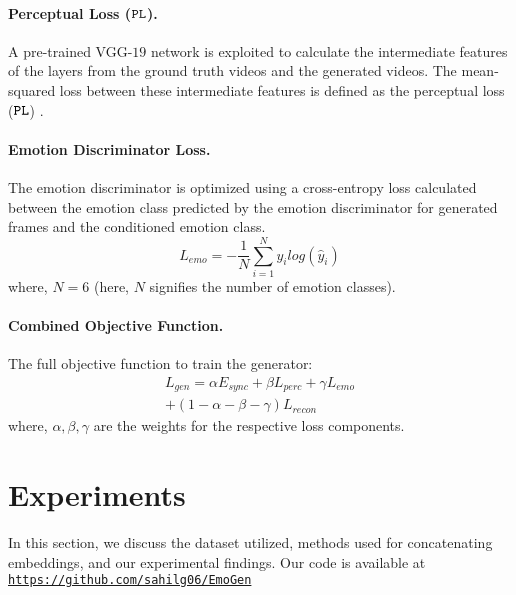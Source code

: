 \documentclass[accepted]{uai2023}
\begin{document}
\paragraph{Perceptual Loss (${\tt PL}$).}
A pre-trained VGG-$19$ network \citep{simonyan2014very} is exploited to calculate the intermediate features of the layers from the ground truth videos and the generated videos. The mean-squared loss between these intermediate features is defined as the perceptual loss (${\tt PL}$) \citep{johnson2016perceptual}.

\paragraph{Emotion Discriminator Loss.}
The emotion discriminator is optimized using a cross-entropy loss calculated between the emotion class predicted by the emotion discriminator for generated frames and the conditioned emotion class. 
\begin{equation}
    L_{emo} = -\frac{1}{N}\sum_{i=1}^{N}y_{i}log(\hat{y}_{i})
\end{equation}
where, $N=6$ (here, $N$ signifies the number of emotion classes).

\paragraph{Combined Objective Function.}
The full objective function to train the generator:
\begin{equation}
\begin{split}
    L_{gen} = \alpha E_{sync} + \beta L_{perc} + \gamma L_{emo}\\ + (1-\alpha-\beta-\gamma) L_{recon}
\end{split}
\end{equation}
where, $\alpha, \beta, \gamma$ are the weights for the respective loss components.

\section{Experiments}
In this section, we discuss the dataset utilized, methods used for concatenating embeddings, and our experimental findings. Our code is available at \href{https://github.com/sahilg06/EmoGen}{\tt{https://github.com/sahilg06/EmoGen}}
\end{document}
